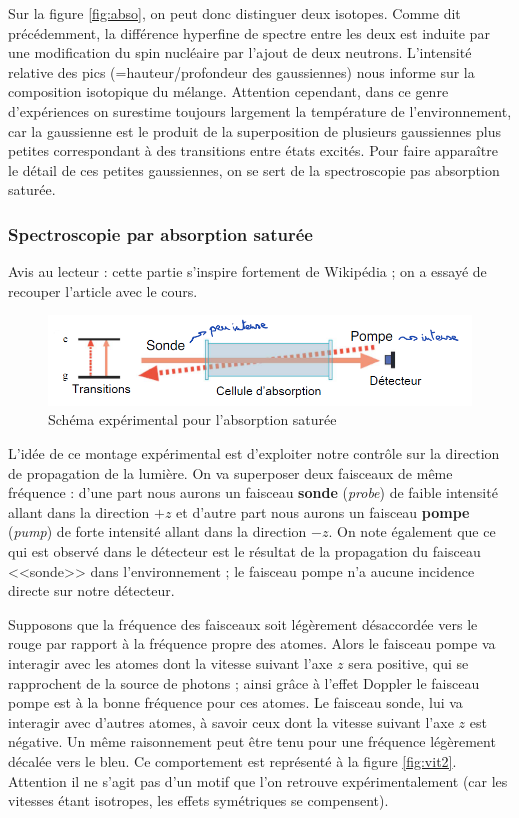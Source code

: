 Sur la figure \ref{fig:abso}, on peut donc distinguer deux isotopes. Comme dit précédemment, la différence hyperfine de spectre entre les deux est induite par une modification du spin nucléaire par l'ajout de deux neutrons. L'intensité relative des pics (=hauteur/profondeur des gaussiennes) nous informe sur la composition isotopique du mélange. Attention cependant, dans ce genre d'expériences on surestime toujours largement la température de l'environnement, car la gaussienne est le produit de la superposition de plusieurs gaussiennes plus petites correspondant à des transitions entre états excités. Pour faire apparaître le détail de ces petites gaussiennes, on se sert de la spectroscopie pas absorption saturée.


\subsubsection{Spectroscopie par absorption saturée}
Avis au lecteur : cette partie s'inspire fortement de Wikipédia ; on a essayé de recouper l'article avec le cours.\\
\begin{figure}[htp]
    \centering
    \includegraphics[width=\textwidth]{Images2/AbsoSatu.PNG}
    \caption{Schéma expérimental pour l'absorption saturée}
\label{fig:absoSatu}
\end{figure}
L'idée de ce montage expérimental est d'exploiter notre contrôle sur la direction de propagation de la lumière. On va superposer deux faisceaux de même fréquence : d'une part nous aurons un faisceau \textbf{sonde} (\textit{probe}) de faible intensité allant dans la direction $+z$ et d'autre part nous aurons un faisceau \textbf{pompe} (\textit{pump}) de forte intensité allant dans la direction $-z$. On note également que ce qui est observé dans le détecteur est le résultat de la propagation du faisceau <<sonde>> dans l'environnement ; le faisceau pompe n'a aucune incidence directe sur notre détecteur.

Supposons que la fréquence des faisceaux soit légèrement désaccordée vers le rouge par rapport à la fréquence propre des atomes. Alors le faisceau pompe va interagir avec les atomes dont la vitesse suivant l'axe $z$ sera positive, qui se rapprochent de la source de photons ; ainsi grâce à l'effet Doppler le faisceau pompe est à la bonne fréquence pour ces atomes. Le faisceau sonde, lui va interagir avec d'autres atomes, à savoir ceux dont la vitesse suivant l'axe $z$ est négative. Un même raisonnement peut être tenu pour une fréquence légèrement décalée vers le bleu. Ce comportement est représenté à la figure \ref{fig:vit2}. Attention il ne s'agit pas d'un motif que l'on retrouve expérimentalement (car les vitesses étant isotropes, les effets symétriques se compensent).

